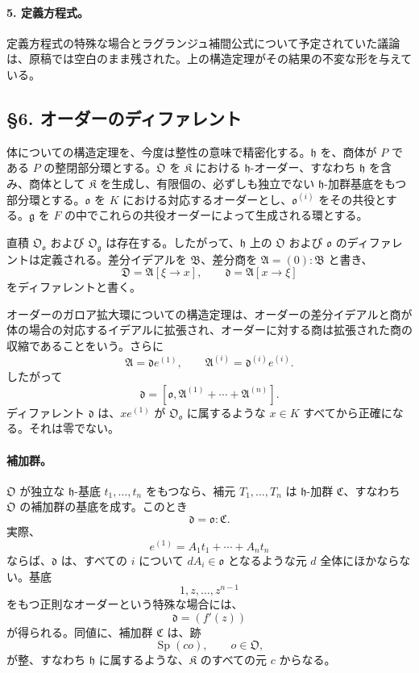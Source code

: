 \documentclass[11pt]{article}
\begin{document}
\paragraph{5. 定義方程式。}
定義方程式の特殊な場合とラグランジュ補間公式について予定されていた議論は、原稿では空白のまま残された。上の構造定理がその結果の不変な形を与えている。

\subsection*{§6. オーダーのディファレント}

体についての構造定理を、今度は整性の意味で精密化する。\(\mathfrak h\) を、商体が \(P\) である \(P\) の整閉部分環とする。\(\mathfrak O\) を \(\mathfrak K\) における \(\mathfrak h\)-オーダー、すなわち \(\mathfrak h\) を含み、商体として \(\mathfrak K\) を生成し、有限個の、必ずしも独立でない \(\mathfrak h\)-加群基底をもつ部分環とする。\(\mathfrak o\) を \(K\) における対応するオーダーとし、\(\mathfrak o^{(i)}\) をその共役とする。\(\mathfrak g\) を \(F\) の中でこれらの共役オーダーによって生成される環とする。

直積 \(\mathfrak O_{\mathfrak o}\) および \(\mathfrak O_{\mathfrak g}\) は存在する。したがって、\(\mathfrak h\) 上の \(\mathfrak O\) および \(\mathfrak o\) のディファレントは定義される。差分イデアルを \(\mathfrak B\)、差分商を \(\mathfrak A=(0):\mathfrak B\) と書き、
\[
        \mathfrak D=\mathfrak A[\xi\to x],
        \qquad
        \mathfrak d=\mathfrak A[x\to\xi]
\]
をディファレントと書く。

オーダーのガロア拡大環についての構造定理は、オーダーの差分イデアルと商が体の場合の対応するイデアルに拡張され、オーダーに対する商は拡張された商の収縮であることをいう。さらに
\[
        \mathfrak A=\mathfrak d e^{(1)},
        \qquad
        \mathfrak A^{(i)}=\mathfrak d^{(i)}e^{(i)}.
\]
したがって
\[
        \mathfrak d=[\mathfrak o,
        \mathfrak A^{(1)}+
        \cdots+\mathfrak A^{(n)}].
\]
ディファレント \(\mathfrak d\) は、\(xe^{(1)}\) が \(\mathfrak O_{\mathfrak o}\) に属するような \(x\in K\) すべてから正確になる。それは零でない。

\paragraph{補加群。}
\(\mathfrak O\) が独立な \(\mathfrak h\)-基底 \(t_1,\ldots,t_n\) をもつなら、補元 \(T_1,\ldots,T_n\) は \(\mathfrak h\)-加群 \(\mathfrak C\)、すなわち \(\mathfrak O\) の補加群の基底を成す。このとき
\[
        \mathfrak d=\mathfrak o:\mathfrak C.
\]
実際、
\[
        e^{(1)}=A_1t_1+
        \cdots+A_nt_n
\]
ならば、\(\mathfrak d\) は、すべての \(i\) について \(dA_i\in\mathfrak o\) となるような元 \(d\) 全体にほかならない。基底
\[
        1,z,\ldots,z^{n-1}
\]
をもつ正則なオーダーという特殊な場合には、
\[
        \mathfrak d=(f'(z))
\]
が得られる。同値に、補加群 \(\mathfrak C\) は、跡
\[
        \operatorname{Sp}(co),\qquad o\in\mathfrak O,
\]
が整、すなわち \(\mathfrak h\) に属するような、\(\mathfrak K\) のすべての元 \(c\) からなる。
\end{document}
